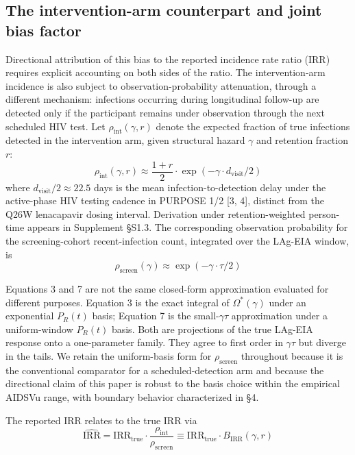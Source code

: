 \documentclass[12pt]{article}
\begin{document}
\subsection{The intervention-arm counterpart and joint bias factor}

Directional attribution of this bias to the reported incidence rate ratio (IRR) requires explicit accounting on both sides of the ratio. The intervention-arm incidence is also subject to observation-probability attenuation, through a different mechanism: infections occurring during longitudinal follow-up are detected only if the participant remains under observation through the next scheduled HIV test. Let $\rho_{\mathrm{int}}(\gamma, r)$ denote the expected fraction of true infections detected in the intervention arm, given structural hazard $\gamma$ and retention fraction $r$:
\begin{equation}
\rho_{\mathrm{int}}(\gamma, r) \approx \frac{1 + r}{2} \cdot \exp(-\gamma \cdot d_{\mathrm{visit}}/2)
\end{equation}
where $d_{\mathrm{visit}}/2 \approx 22.5$ days is the mean infection-to-detection delay under the active-phase HIV testing cadence in PURPOSE 1/2 [3, 4], distinct from the Q26W lenacapavir dosing interval. Derivation under retention-weighted person-time appears in Supplement \S S1.3. The corresponding observation probability for the screening-cohort recent-infection count, integrated over the LAg-EIA window, is
\begin{equation}
\rho_{\mathrm{screen}}(\gamma) \approx \exp(-\gamma \cdot \tau / 2)
\end{equation}

Equations 3 and 7 are not the same closed-form approximation evaluated for different purposes. Equation 3 is the exact integral of $\Omega^*(\gamma)$ under an exponential $P_R(t)$ basis; Equation 7 is the small-$\gamma\tau$ approximation under a uniform-window $P_R(t)$ basis. Both are projections of the true LAg-EIA response onto a one-parameter family. They agree to first order in $\gamma\tau$ but diverge in the tails. We retain the uniform-basis form for $\rho_{\mathrm{screen}}$ throughout because it is the conventional comparator for a scheduled-detection arm and because the directional claim of this paper is robust to the basis choice within the empirical AIDSVu range, with boundary behavior characterized in \S 4.

The reported IRR relates to the true IRR via
\begin{equation}
\widehat{\mathrm{IRR}} = \mathrm{IRR}_{\mathrm{true}} \cdot \frac{\rho_{\mathrm{int}}}{\rho_{\mathrm{screen}}} \equiv \mathrm{IRR}_{\mathrm{true}} \cdot B_{\mathrm{IRR}}(\gamma, r)
\end{equation}
\end{document}
